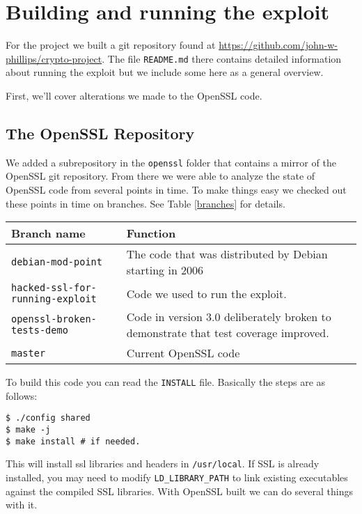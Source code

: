 \documentclass[conference]{IEEEtran}
\begin{document}
\appendices{}
\section{Building and running the exploit}
For the project we built a git repository found at
\url{https://github.com/john-w-phillips/crypto-project}. The file
\verb|README.md| there contains detailed information about running the
exploit but we include some here as a general overview.

First, we'll cover alterations we made to the OpenSSL code.

\subsection{The OpenSSL Repository}
We added a subrepository in the \verb|openssl| folder that contains a
mirror of the OpenSSL git repository. From there we were able to
analyze the state of OpenSSL code from several points in time. To make
things easy we checked out these points in time on branches. See
Table \ref{branches} for details.

\begin{table*}[!t]
  \centering
  \begin{tabular}{|l|l|}
    \hline
    Branch name & Function \\ \hline
    \verb|debian-mod-point| & The code that was distributed by Debian starting in 2006 \\ \hline
    \verb|hacked-ssl-for-running-exploit| & Code we used to run the exploit. \\ \hline
    \verb|openssl-broken-tests-demo| & Code in version 3.0 deliberately broken to demonstrate that test coverage improved. \\ \hline
    \verb|master| & Current OpenSSL code \\ \hline
  \end{tabular}
  \caption{Branches in the openssl subrepository and their function.}
  \label{branches}
\end{table*}

To build this code you can read the \verb|INSTALL| file. Basically the
steps are as follows:

\begin{verbatim}
$ ./config shared
$ make -j
$ make install # if needed.
\end{verbatim}

This will install ssl libraries and headers in \verb|/usr/local|. If
SSL is already installed, you may need to modify
\verb|LD_LIBRARY_PATH| to link existing executables against the
compiled SSL libraries.  With OpenSSL built we can do several things
with it.
\end{document}
